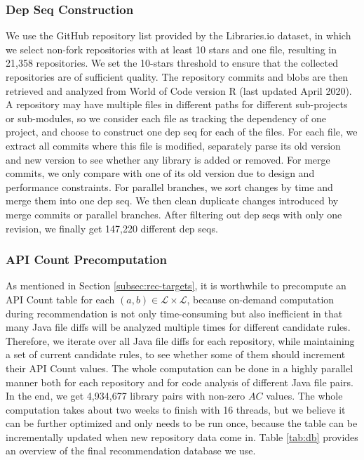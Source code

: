 \documentclass[conference, 10pt]{IEEEtran}
\begin{document}
\subsubsection{Dep Seq Construction}

We use the GitHub repository list provided by the Libraries.io dataset, in which we select non-fork repositories with at least 10 stars and one  file, resulting in 21,358 repositories.
We set the 10-stars threshold to ensure that the collected repositories are of sufficient quality.
The repository commits and blobs are then retrieved and analyzed from World of Code version R (last updated April 2020).
A repository may have multiple  files in different paths for different sub-projects or sub-modules, so we consider each file as tracking the dependency of one project, and choose to construct one dep seq for each of the  files.
For each  file, we extract all commits where this file is modified, separately parse its old version and new version to see whether any library is added or removed. 
For merge commits, we only compare with one of its old version due to design and performance constraints.
For parallel branches, we sort changes by time and merge them into one dep seq. 
We then clean duplicate changes introduced by merge commits or parallel branches. After filtering out dep seqs with only one revision, we finally get 147,220 different dep seqs.

\subsubsection{API Count Precomputation}

As mentioned in Section \ref{subsec:rec-targets}, it is worthwhile to precompute an API Count table for each $(a,b)\in \mathcal{L} \times \mathcal{L}$, because on-demand computation during recommendation is not only time-consuming but also inefficient in that many Java file diffs will be analyzed multiple times for different candidate rules. 
Therefore, we iterate over all Java file diffs for each repository, while maintaining a set of current candidate rules, to see whether some of them should increment their API Count values.
The whole computation can be done in a highly parallel manner both for each repository and for code analysis of different Java file pairs.
In the end, we get 4,934,677 library pairs with non-zero $AC$ values.
The whole computation takes about two weeks to finish with 16 threads, but we believe it can be further optimized and only needs to be run once, because the table can be incrementally updated when new repository data come in. Table \ref{tab:db} provides an overview of the final recommendation database we use.
\end{document}
